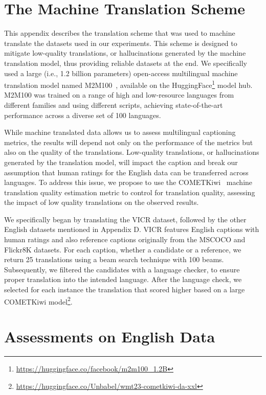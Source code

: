 \section{The Machine Translation Scheme} \label{app:translation}
This appendix describes the translation scheme that was used to machine translate the datasets used in our experiments. This scheme is designed to mitigate low-quality translations, or hallucinations generated by the machine translation model, thus providing reliable datasets at the end. We specifically used a large (i.e., 1.2 billion parameters) open-access multilingual machine translation model named M2M100~\cite{m2m100}, available on the HuggingFace\footnote{ \url{https://huggingface.co/facebook/m2m100_1.2B}}  model hub. M2M100 was trained on a range of high and low-resource languages from different families and using different scripts, achieving state-of-the-art performance across a diverse set of 100 languages. 

While machine translated data allows us to assess multilingual captioning metrics, the results will depend not only on the performance of the metrics but also on the quality of the translations. Low-quality translations, or hallucinations generated by the translation model, will impact the caption and break our assumption that human ratings for the English data can be transferred across languages. To address this issue, we propose to use the COMETKiwi~\cite{rei2022cometkiwi,rei2023scaling} machine translation quality estimation metric to control for translation quality, assessing the impact of low quality translations on the observed results. 

We specifically began by translating the VICR dataset, followed by the other English datasets mentioned in Appendix D. VICR features English captions with human ratings and also reference captions originally from the MSCOCO and Flickr8K datasets. For each caption, whether a candidate or a reference, we return 25 translations using a beam search technique with 100 beams. Subsequently, we filtered the candidates with a language checker, to ensure proper translation into the intended language. After the language check, we selected for each instance the translation that scored higher based on a large COMETKiwi model\footnote{\url{https://huggingface.co/Unbabel/wmt23-cometkiwi-da-xxl}}.


\section{Assessments on English Data} \label{app:english_experiments}

